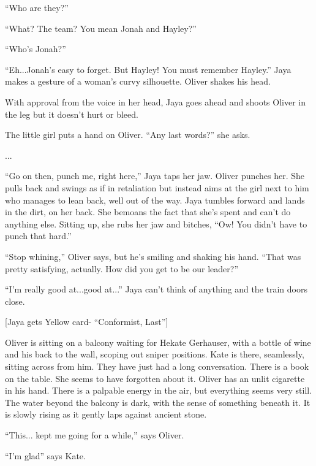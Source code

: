 ``Who are they?''

``What?  The team?  You mean Jonah and Hayley?''

``Who's Jonah?''

``Eh...Jonah's easy to forget.  But Hayley!  You must remember Hayley.''  Jaya makes a gesture of a woman's curvy silhouette.  Oliver shakes his head.



With approval from the voice in her head, Jaya goes ahead and shoots Oliver in the leg but it doesn't hurt or bleed.



The little girl puts a hand on Oliver.  ``Any last words?'' she asks.

...

``Go on then, punch me, right here,'' Jaya taps her jaw.  Oliver punches her.   She pulls back and swings as if in retaliation but instead aims at the girl next to him who manages to lean back, well out of the way.  Jaya tumbles forward and lands in the dirt, on her back.   She bemoans the fact that she's spent and can't do anything else.  Sitting up, she rubs her jaw and bitches, ``Ow!  You didn't have to punch that hard.'' 

``Stop whining,'' Oliver says, but he's smiling and shaking his hand.  ``That was pretty satisfying, actually.  How did you get to be our leader?''

``I'm really good at...good at...'' Jaya can't think of anything and the train doors close.



{[}Jaya gets Yellow card- ``Conformist, Last''{]}




Oliver is sitting on a balcony waiting for Hekate Gerhauser, with a bottle of wine and his back to the wall, scoping out sniper positions. Kate is there, seamlessly, sitting across from him. They have just had a long conversation. There is a book on the table. She seems to have forgotten about it. Oliver has an unlit cigarette in his hand. There is a palpable energy in the air, but everything seems very still.  The water beyond the balcony is dark, with the sense of something beneath it. It is slowly rising as it gently laps against ancient stone.



``This... kept me going for a while,'' says Oliver.

``I'm glad'' says Kate.


